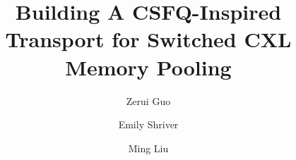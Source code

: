 

\newcommand{\ming}[1]{}
\newcommand{\zerui}[1]{}

\date{}

\title{Building A CSFQ-Inspired Transport for Switched CXL Memory Pooling}

\makeatletter 
\renewcommand\AB@affilsepx{\hspace{2mm} \protect\Affilfont} 
\makeatother

\author[1]{Zerui Guo}
\author[2]{Emily Shriver}
\author[1]{Ming Liu}

\newcommand{\sys}{MemChannel\xspace}



